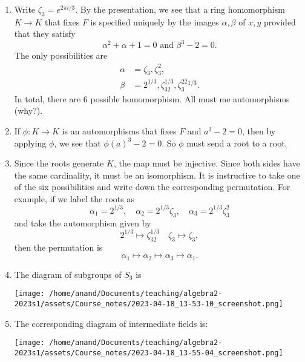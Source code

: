 \documentclass[12pt]{amsart}
\begin{document}
\begin{enumerate}
\item Write \(\zeta_3 = e^{2\pi i /3}\).
 By the presentation, we see that a ring homomorphism \(K \to K\) that fixes \(F\) is specified uniquely by the images \(\alpha, \beta\) of \(x, y\) provided that they satisfy
\[\alpha^2+\alpha+1 = 0 \text{ and } \beta^{3}-2 = 0.\]
The only possibilities are
\begin{align*}
 \alpha &= \zeta_3, \zeta_{3}^{2},\\
 \beta &= 2^{1/3}, \zeta_32^{1/3}, \zeta_3^22^{1/3}.
 \end{align*}
In total, there are 6 possible homomorphism.
All must me automorphisms (why?).

\item If \(\phi \colon K \to K\) is an automorphisms that fixes \(F\) and \(a^3-2 = 0\), then by applying \(\phi\), we see that \(\phi(a)^3-2 = 0\).
So \(\phi\) must send a root to a root.

\item Since the roots generate \(K\), the map must be injective.
Since both sides have the same cardinality, it must be an isomorphism.
It is instructive to take one of the six possibilities and write down the corresponding permutation.
For example, if we label the roots as
\[ \alpha_1 = 2^{1/3},\quad \alpha_2=2^{1/3} \zeta_3,\quad \alpha_3 = 2^{1/3}\zeta_{3}^{2}\]
and take the automorphism given by
\[ 2^{1/3} \mapsto \zeta_32^{1/3} \quad \zeta_3 \mapsto \zeta_3,\]
then the permutation is
\[ \alpha_1 \mapsto \alpha_2 \mapsto \alpha_3 \mapsto \alpha_1.\]

\item The diagram of subgroups of \(S_3\) is
\begin{center}
\texttt{[image: /home/anand/Documents/teaching/algebra2-2023s1/assets/Course\_notes/2023-04-18\_13-53-10\_screenshot.png]}
\end{center}

\item The corresponding diagram of intermediate fields is:

\begin{center}
\texttt{[image: /home/anand/Documents/teaching/algebra2-2023s1/assets/Course\_notes/2023-04-18\_13-55-04\_screenshot.png]}
\end{center}
\end{enumerate}
\end{document}
